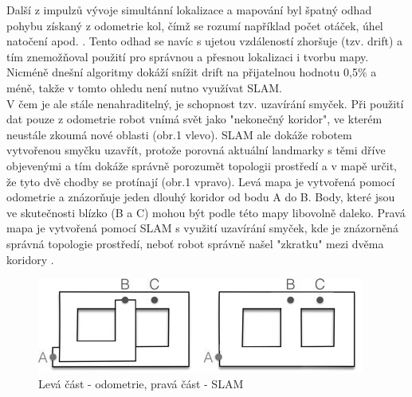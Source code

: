 \documentclass[12pt,a4paper]{article}
\begin{document}
Další z impulzů vývoje simultánní lokalizace a mapování byl špatný odhad pohybu získaný z odometrie kol, čímž se rozumí například počet otáček, úhel natočení apod. \cite{Past_Present_and_Future_of_Simultaneous_Localization_And_Mapping}. Tento odhad se navíc s ujetou vzdáleností zhoršuje (tzv. drift) a tím znemožňoval použití pro správnou a přesnou lokalizaci i tvorbu mapy. Nicméně dnešní algoritmy dokáží snížit drift na přijatelnou hodnotu 0,5\% a méně, takže v tomto ohledu není nutno využívat SLAM. \\ V čem je ale stále nenahraditelný, je schopnost tzv. uzavírání smyček. Při použití dat pouze z odometrie robot vnímá svět jako "nekonečný koridor", ve kterém neustále zkoumá nové oblasti (obr.1 vlevo). SLAM ale dokáže robotem vytvořenou smyčku uzavřít, protože porovná aktuální landmarky s těmi dříve objevenými a tím dokáže správně porozumět topologii prostředí a v mapě určit, že tyto dvě chodby se protínají (obr.1 vpravo). Levá mapa je vytvořená pomocí odometrie a znázorňuje jeden dlouhý koridor od bodu A do B. Body, které jsou ve skutečnosti blízko (B a C) mohou být podle této mapy libovolně daleko. Pravá mapa je vytvořená pomocí SLAM s využití uzavírání smyček, kde je znázorněná správná topologie prostředí, neboť robot správně našel "zkratku" mezi dvěma koridory \cite{Past_Present_and_Future_of_Simultaneous_Localization_And_Mapping}.

\begin{figure}[H]
\centering
\includegraphics[scale=1]{img/Obr1_b} 
\caption{Levá část - odometrie, pravá část - SLAM} 
\end{figure}
\end{document}
